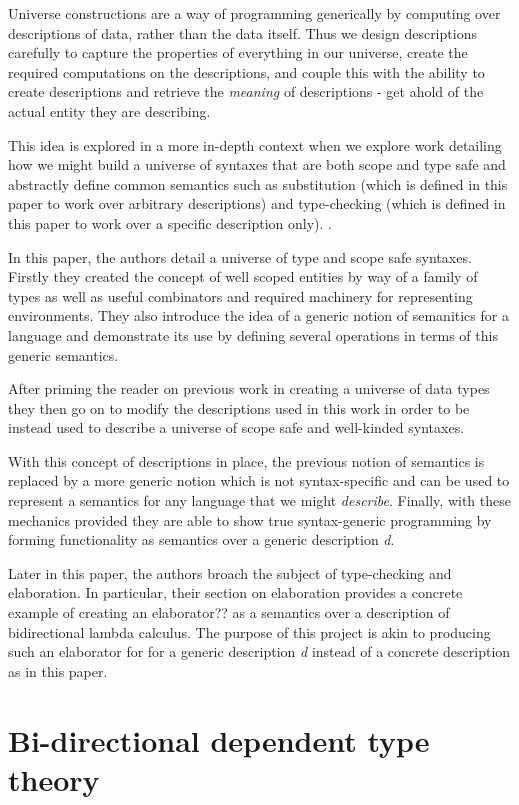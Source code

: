 Universe constructions are a way of programming generically by
computing over descriptions of data, rather than the data itself. Thus
we design descriptions carefully to capture the properties of
everything in our universe, create the required computations on the
descriptions, and couple this with the ability to create descriptions
and retrieve the \emph{meaning} of descriptions - get ahold of
the actual entity they are describing.

This idea is explored in a more in-depth context when we
explore work detailing how we might build a universe of
syntaxes that are both scope and type safe and abstractly
define common semantics such as substitution (which is defined in this
paper to work over arbitrary descriptions) and type-checking (which is
defined in this paper to work over a specific description only).
\cite{DBLP:journals/corr/abs-2001-11001}.

In this paper, the authors detail a universe of type and scope safe
syntaxes. Firstly they created the concept of well scoped entities by
way of a family of types as well as useful combinators and required machinery
for representing environments. They also introduce the idea of a
generic notion of semanitics for a language and demonstrate its use by
defining several operations in terms of this generic semantics.

After priming the reader on previous work in creating a universe of
data types \cite{DBLP:conf/icfp/ChapmanDMM10} they then go on to
modify the descriptions used in this work in order to be instead used
to describe a universe of scope safe and well-kinded syntaxes.

With this concept of descriptions in place, the previous notion of
semantics is replaced by a more generic notion which is not
syntax-specific and can be used to represent a semantics for any
language that we might \emph{describe}. Finally, with these mechanics
provided they are able to show true syntax-generic programming by
forming functionality as semantics over a generic description
\emph{d}.

Later in this paper, the authors broach the subject of type-checking
and elaboration. In particular, their section on elaboration provides
a concrete example of creating an elaborator?? as a semantics over a
description of bidirectional lambda calculus. The purpose of this
project is akin to producing such an elaborator for for a
generic description \emph{d} instead of a concrete description as in
this paper.

\section{Bi-directional dependent type theory}

